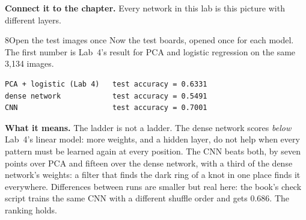 \textbf{Connect it to the chapter.} Every network in this lab is this picture with different layers.


\begin{labquestion}{8}{Open the test images once}
Now the test boards, opened once for each model. The first number is Lab~4's result for PCA and logistic regression on the same 3,134 images.
\end{labquestion}
\begin{labanswer}

\begin{refoutput}
\begin{lstlisting}[style=utpterminal]
PCA + logistic (Lab 4)   test accuracy = 0.6331
dense network            test accuracy = 0.5491
CNN                      test accuracy = 0.7001
\end{lstlisting}
\end{refoutput}

\textbf{What it means.} The ladder is not a ladder. The dense network scores \emph{below} Lab~4's linear model: more weights, and a hidden layer, do not help when every pattern must be learned again at every position. The CNN beats both, by seven points over PCA and fifteen over the dense network, with a third of the dense network's weights: a filter that finds the dark ring of a knot in one place finds it everywhere. Differences between runs are smaller but real here: the book's check script trains the same CNN with a different shuffle order and gets 0.686. The ranking holds.
\end{labanswer}

